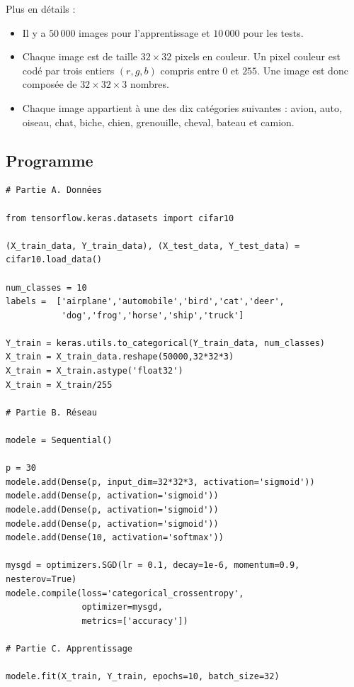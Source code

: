 \documentclass[11pt,class=report,crop=false]{standalone}
\begin{document}
Plus en détails :
\begin{itemize}
  \item  Il y a $50\,000$ images pour l'apprentissage et $10\,000$ pour les tests.
  \item Chaque image est de taille $32\times 32$ pixels en couleur. 
  Un pixel couleur est codé par trois entiers $(r,g,b)$ compris entre $0$ et $255$.
  Une image est donc composée de $32\times32\times3$ nombres.
  
  \item Chaque image appartient à une des dix catégories suivantes : avion, auto, oiseau, chat, biche, chien, grenouille, cheval, bateau et camion.
\end{itemize}


\subsection{Programme}

\begin{lstlisting}
# Partie A. Données

from tensorflow.keras.datasets import cifar10

(X_train_data, Y_train_data), (X_test_data, Y_test_data) = cifar10.load_data()

num_classes = 10
labels =  ['airplane','automobile','bird','cat','deer',
           'dog','frog','horse','ship','truck']

Y_train = keras.utils.to_categorical(Y_train_data, num_classes)
X_train = X_train_data.reshape(50000,32*32*3)
X_train = X_train.astype('float32')
X_train = X_train/255

# Partie B. Réseau 

modele = Sequential()

p = 30
modele.add(Dense(p, input_dim=32*32*3, activation='sigmoid'))
modele.add(Dense(p, activation='sigmoid'))
modele.add(Dense(p, activation='sigmoid'))
modele.add(Dense(p, activation='sigmoid'))
modele.add(Dense(10, activation='softmax'))

mysgd = optimizers.SGD(lr = 0.1, decay=1e-6, momentum=0.9, nesterov=True)
modele.compile(loss='categorical_crossentropy',
               optimizer=mysgd,
               metrics=['accuracy'])

# Partie C. Apprentissage

modele.fit(X_train, Y_train, epochs=10, batch_size=32)
\end{lstlisting}
\end{document}
